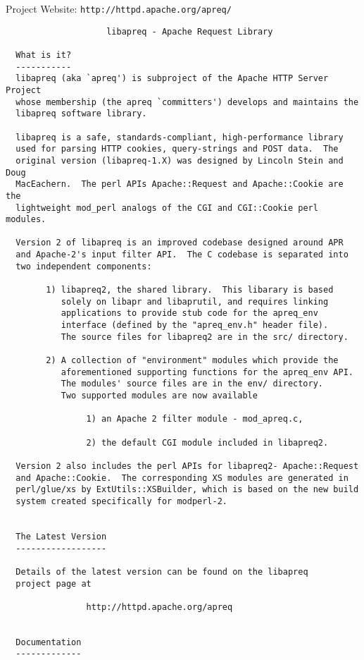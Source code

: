 Project Website: {\tt http://httpd.apache.org/apreq/} 

\footnotesize\begin{verbatim}
                    libapreq - Apache Request Library

  What is it?
  -----------
  libapreq (aka `apreq') is subproject of the Apache HTTP Server Project 
  whose membership (the apreq `committers') develops and maintains the 
  libapreq software library.

  libapreq is a safe, standards-compliant, high-performance library 
  used for parsing HTTP cookies, query-strings and POST data.  The 
  original version (libapreq-1.X) was designed by Lincoln Stein and Doug 
  MacEachern.  The perl APIs Apache::Request and Apache::Cookie are the
  lightweight mod_perl analogs of the CGI and CGI::Cookie perl modules.

  Version 2 of libapreq is an improved codebase designed around APR
  and Apache-2's input filter API.  The C codebase is separated into
  two independent components:

        1) libapreq2, the shared library.  This libarary is based 
           solely on libapr and libaprutil, and requires linking
           applications to provide stub code for the apreq_env
           interface (defined by the "apreq_env.h" header file).
           The source files for libapreq2 are in the src/ directory.

        2) A collection of "environment" modules which provide the
           aforementioned supporting functions for the apreq_env API.
           The modules' source files are in the env/ directory.
           Two supported modules are now available

                1) an Apache 2 filter module - mod_apreq.c,

                2) the default CGI module included in libapreq2.

  Version 2 also includes the perl APIs for libapreq2- Apache::Request 
  and Apache::Cookie.  The corresponding XS modules are generated in
  perl/glue/xs by ExtUtils::XSBuilder, which is based on the new build 
  system created specifically for modperl-2.


  The Latest Version
  ------------------

  Details of the latest version can be found on the libapreq
  project page at 

                http://httpd.apache.org/apreq


  Documentation
  -------------


\end{verbatim}
